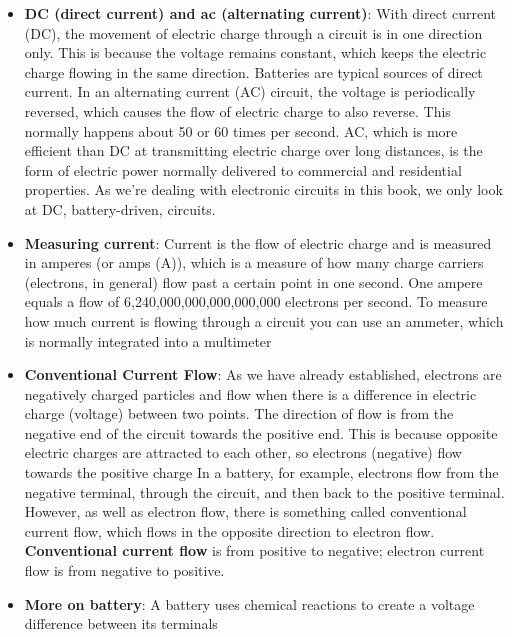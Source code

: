 \documentclass{report}
\begin{document}
\begin{itemize}
        \item \textbf{DC (direct current) and ac (alternating current)}: With direct current (DC), the movement of electric charge through a circuit is in one direction only. This is because the voltage remains constant, which keeps the electric charge flowing in the same direction. Batteries are typical sources of direct current.
            \bigbreak \noindent 
            In an alternating current (AC) circuit, the voltage is periodically reversed, which causes the flow of electric charge to also reverse. This normally happens about 50 or 60 times per second. AC, which is more efficient than DC at transmitting electric charge over long distances, is the form of electric power normally delivered to commercial and residential properties.
            \bigbreak \noindent 
            As we're dealing with electronic circuits in this book, we only look at DC, battery-driven, circuits.
        \item \textbf{Measuring current}: Current is the flow of electric charge and is measured in amperes (or amps (A)), which is a measure of how many charge carriers (electrons, in general) flow past a certain point in one second. One ampere equals a flow of 6,240,000,000,000,000,000 electrons per second.
            \bigbreak \noindent 
            To measure how much current is flowing through a circuit you can use an ammeter, which is normally integrated into a multimeter
        \item \textbf{Conventional Current Flow}: As we have already established, electrons are negatively charged particles and flow when there is a difference in electric charge (voltage) between two points. The direction of flow is from the negative end of the circuit towards the positive end. This is because opposite electric charges are attracted to each other, so electrons (negative) flow towards the positive charge
            \bigbreak \noindent 
            In a battery, for example, electrons flow from the negative terminal, through the circuit, and then back to the positive terminal.
            \bigbreak \noindent 
            However, as well as electron flow, there is something called conventional current flow, which flows in the opposite direction to electron flow.
            \bigbreak \noindent 
            \textbf{Conventional current flow} is from positive to negative; electron current flow is from negative to positive.
            \bigbreak \noindent 
        \item \textbf{More on battery}: A battery uses chemical reactions to create a voltage difference between its terminals

\end{itemize}
\end{document}
